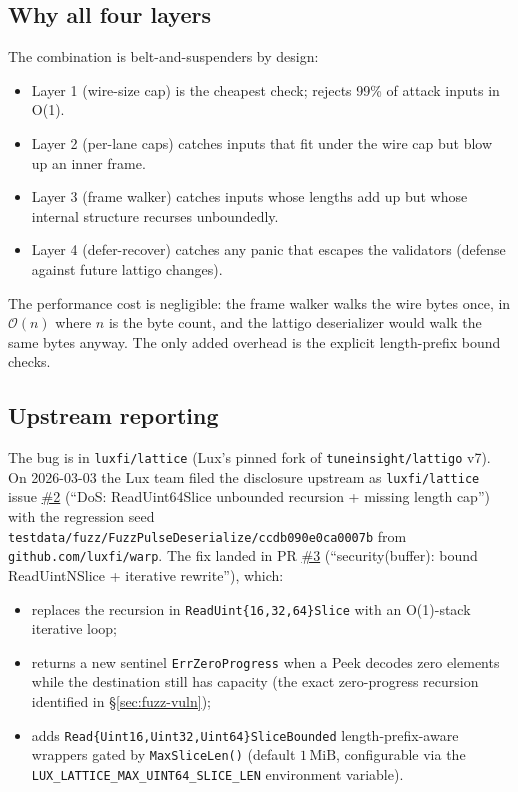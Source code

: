 \subsection{Why all four layers}

The combination is belt-and-suspenders by design:
\begin{itemize}[leftmargin=2em,nosep]
  \item Layer 1 (wire-size cap) is the cheapest check; rejects 99\% of attack inputs in O(1).
  \item Layer 2 (per-lane caps) catches inputs that fit under the wire cap but blow up an inner frame.
  \item Layer 3 (frame walker) catches inputs whose lengths add up but whose internal structure recurses unboundedly.
  \item Layer 4 (defer-recover) catches any panic that escapes the validators (defense against future lattigo changes).
\end{itemize}

The performance cost is negligible: the frame walker walks the wire bytes once, in $\mathcal{O}(n)$ where $n$ is the byte count, and the lattigo deserializer would walk the same bytes anyway. The only added overhead is the explicit length-prefix bound checks.

\subsection{Upstream reporting}

The bug is in \texttt{luxfi/lattice} (Lux's pinned fork of \texttt{tuneinsight/lattigo} v7). On 2026-03-03 the Lux team filed the disclosure upstream as \texttt{luxfi/lattice} issue \href{https://github.com/luxfi/lattice/issues/2}{\#2} (``DoS: ReadUint64Slice unbounded recursion + missing length cap'') with the regression seed \texttt{testdata/fuzz/FuzzPulseDeserialize/ccdb090e0ca0007b} from \texttt{github.com/luxfi/warp}. The fix landed in PR \href{https://github.com/luxfi/lattice/pull/3}{\#3} (``security(buffer): bound ReadUintNSlice + iterative rewrite''), which:
\begin{itemize}[leftmargin=2em,nosep]
  \item replaces the recursion in \texttt{ReadUint\{16,32,64\}Slice} with an O(1)-stack iterative loop;
  \item returns a new sentinel \texttt{ErrZeroProgress} when a Peek decodes zero elements while the destination still has capacity (the exact zero-progress recursion identified in \S\ref{sec:fuzz-vuln});
  \item adds \texttt{Read\{Uint16,Uint32,Uint64\}SliceBounded} length-prefix-aware wrappers gated by \texttt{MaxSliceLen()} (default $1\,\mathrm{MiB}$, configurable via the \texttt{LUX\_LATTICE\_MAX\_UINT64\_SLICE\_LEN} environment variable).
\end{itemize}

